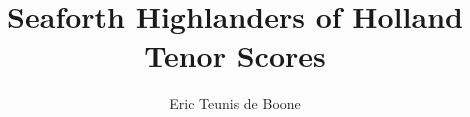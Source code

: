 \documentclass{tex/score_book}
\title{Seaforth Highlanders of Holland\\Tenor Scores}
\author{Eric Teunis de Boone}
\begin{document}


\newpage
\cleardoublepage
{}
{}
\begin{multicols}{2}
  \tableofcontents
\end{multicols}

%
\newpage

\end{document}
